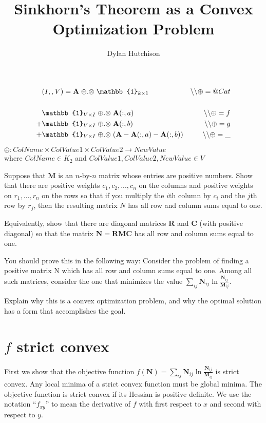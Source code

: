 \documentclass[10pt,a4paper]{article}
\author{Dylan Hutchison}
\title{Sinkhorn's Theorem as a Convex Optimization Problem}
\newcommand{\matr}[1]{\mathbf{#1}} %
\newcommand{\mul}[0]{{\;\oplus.\otimes\;}}
\begin{document}
\maketitle



\begin{align*}
&(I,,V) = \mathbf{A} \mul \mathbb{1}_{k \times 1} &\backslash\backslash \oplus = @Cat \\[\baselineskip]
&\mathbb{1}_{V \times I} \mul \mathbf{A}(:,a)   &\backslash\backslash \oplus = f\\
+ & \mathbb{1}_{V \times I} \mul \mathbf{A}(:,b) &\backslash\backslash \oplus = g\\
+ & \mathbb{1}_{V \times I} \mul (\mathbf{A} - \mathbf{A}(:,a) - \mathbf{A}(:,b)) &\backslash\backslash \oplus = \_
\end{align*}

$\oplus:  ColName \times ColValue1 \times ColValue2 \rightarrow NewValue$ \\
where $ColName \in K_2$ and $ColValue1, ColValue2, NewValue \in V$

Suppose that $\matr{M}$ is an $n$-by-$n$ matrix whose entries are positive numbers.  Show that there are positive weights $c_1, c_2, ..., c_n$ on the columns and positive weights on $r_1, ..., r_n$ on the rows so that if you multiply the $i$th column by $c_i$ and the $j$th row by $r_j$, then the resulting matrix $N$ has all row and column sums equal to one.

Equivalently, show that there are diagonal matrices $\matr{R}$ and $\matr{C}$ (with positive diagonal) so that the matrix $\matr{N}=\matr{R} \matr{M} \matr{C}$ has all row and column sums equal to one.

You should prove this in the following way:  Consider the problem of finding a positive matrix N which has all row and column sums equal to one.  Among all such matrices, consider the one that minimizes the value $\sum_{ij} \matr{N}_{ij} \ln \frac{\matr{N}_{ij}}{\matr{M}_{ij}}$.

Explain why this is a convex optimization problem, and why the optimal solution has a form that accomplishes the goal.

\section{$f$ strict convex}
First we show that the objective function $f(\matr{N}) = \sum_{ij} \matr{N}_{ij} \ln \frac{\matr{N}_{ij}}{\matr{M}_{ij}}$ 
is strict convex. Any local minima of a strict convex function must be global minima.
The objective function is strict convex if its Hessian is positive definite.
We use the notation ``$f_{xy}$'' to mean the derivative of $f$ with first respect to $x$ and 
second with respect to $y$.
\end{document}
